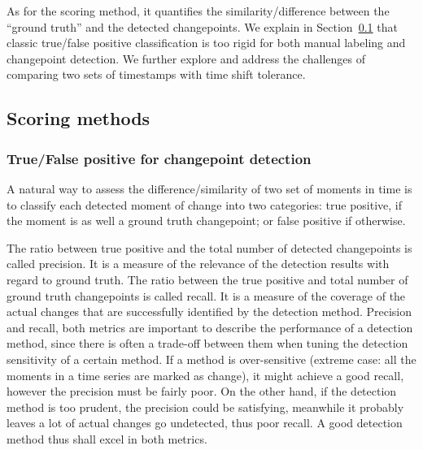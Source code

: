 As for the scoring method, it quantifies the similarity/difference between the ``ground truth'' and the detected changepoints.
We explain in Section~\ref{sec:score} that classic true/false positive classification is too rigid for both manual labeling and changepoint detection.
We further explore and address the challenges of comparing two sets of timestamps with time shift tolerance.

\subsection{Scoring methods}
\label{sec:score}

\subsubsection{True/False positive for changepoint detection}

A natural way to assess the difference/similarity of two set of moments in time is to classify each detected moment of change into two categories: true positive, if the moment is as well a ground truth changepoint; or false positive if otherwise.

The ratio between true positive and the total number of detected changepoints is called precision.
It is a measure of the relevance of the detection results with regard to ground truth.
The ratio between the true positive and total number of ground truth changepoints is called recall.
It is a measure of the coverage of the actual changes that are successfully identified by the detection method.
Precision and recall, both metrics are important to describe the performance of a detection method, since there is often a trade-off between them when tuning the detection sensitivity of a certain method.
If a method is over-sensitive (extreme case: all the moments in a time series are marked as change), it might achieve a good recall,  however the precision must be fairly poor.
On the other hand, if the detection method is too prudent, the precision could be satisfying, meanwhile it probably leaves a lot of actual changes go undetected, thus poor recall.
A good detection method thus shall excel in both metrics.

